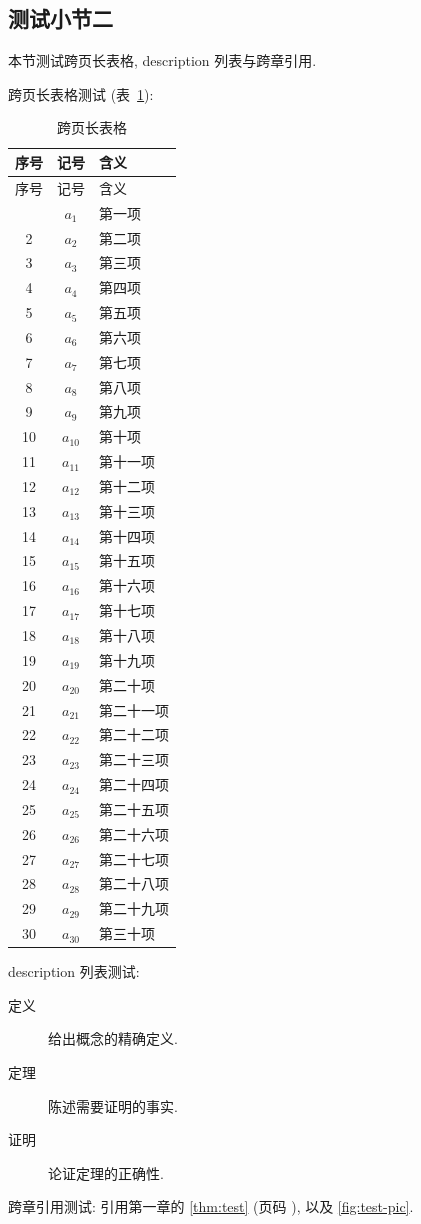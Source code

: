 \subsection{测试小节二}

本节测试跨页长表格, description 列表与跨章引用.

跨页长表格测试 (表~\ref{tab:long}):

\begin{longtable}{ccl}
    \caption{跨页长表格}\label{tab:long}\\
    \hline
    序号 & 记号 & 含义 \\
    \hline
    \endfirsthead
    \hline
    序号 & 记号 & 含义 \\
    \hline
    \endhead
    \hline
    \endfoot
    1 & $a_1$ & 第一项 \\
    2 & $a_2$ & 第二项 \\
    3 & $a_3$ & 第三项 \\
    4 & $a_4$ & 第四项 \\
    5 & $a_5$ & 第五项 \\
    6 & $a_6$ & 第六项 \\
    7 & $a_7$ & 第七项 \\
    8 & $a_8$ & 第八项 \\
    9 & $a_9$ & 第九项 \\
    10 & $a_{10}$ & 第十项 \\
    11 & $a_{11}$ & 第十一项 \\
    12 & $a_{12}$ & 第十二项 \\
    13 & $a_{13}$ & 第十三项 \\
    14 & $a_{14}$ & 第十四项 \\
    15 & $a_{15}$ & 第十五项 \\
    16 & $a_{16}$ & 第十六项 \\
    17 & $a_{17}$ & 第十七项 \\
    18 & $a_{18}$ & 第十八项 \\
    19 & $a_{19}$ & 第十九项 \\
    20 & $a_{20}$ & 第二十项 \\
    21 & $a_{21}$ & 第二十一项 \\
    22 & $a_{22}$ & 第二十二项 \\
    23 & $a_{23}$ & 第二十三项 \\
    24 & $a_{24}$ & 第二十四项 \\
    25 & $a_{25}$ & 第二十五项 \\
    26 & $a_{26}$ & 第二十六项 \\
    27 & $a_{27}$ & 第二十七项 \\
    28 & $a_{28}$ & 第二十八项 \\
    29 & $a_{29}$ & 第二十九项 \\
    30 & $a_{30}$ & 第三十项 \\
\end{longtable}

description 列表测试:

\begin{description}
    \item[定义] 给出概念的精确定义.
    \item[定理] 陈述需要证明的事实.
    \item[证明] 论证定理的正确性.
\end{description}

跨章引用测试: 引用第一章的 \autoref{thm:test} (页码 \pageref{thm:test}), 以及 \autoref{fig:test-pic}.
